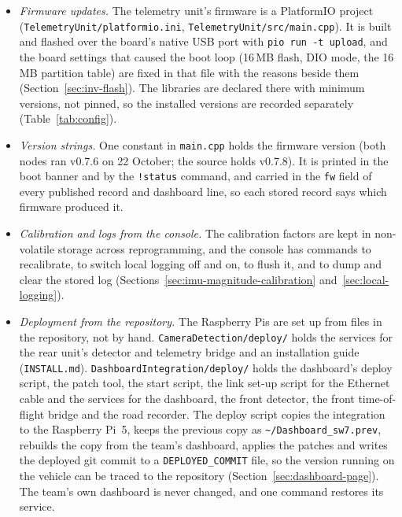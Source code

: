 \begin{itemize}
\item \emph{Firmware updates.} The telemetry unit's firmware is a PlatformIO project (\texttt{TelemetryUnit/\allowbreak{}\allowbreak platformio.ini}, \texttt{TelemetryUnit/\allowbreak{}\allowbreak src/\allowbreak{}main.cpp}). It is built and flashed over the board's native USB port with \texttt{pio run -t upload}, and the board settings that caused the boot loop (16\,MB flash, DIO mode, the 16\,MB partition table) are fixed in that file with the reasons beside them (Section~\ref{sec:inv-flash}). The libraries are declared there with minimum versions, not pinned, so the installed versions are recorded separately (Table~\ref{tab:config}).
\item \emph{Version strings.} One constant in \texttt{main.cpp} holds the firmware version (both nodes ran v0.7.6 on 22 October; the source holds v0.7.8). It is printed in the boot banner and by the \texttt{!status} command, and carried in the \texttt{fw} field of every published record and dashboard line, so each stored record says which firmware produced it.
\item \emph{Calibration and logs from the console.} The calibration factors are kept in non-volatile storage across reprogramming, and the console has commands to recalibrate, to switch local logging off and on, to flush it, and to dump and clear the stored log (Sections~\ref{sec:imu-magnitude-calibration} and~\ref{sec:local-logging}).
\item \emph{Deployment from the repository.} The Raspberry Pis are set up from files in the repository, not by hand. \texttt{CameraDetection/\allowbreak{}\allowbreak deploy/} holds the services for the rear unit's detector and telemetry bridge and an installation guide (\texttt{INSTALL.md}). \texttt{DashboardIntegration/\allowbreak{}\allowbreak deploy/} holds the dashboard's deploy script, the patch tool, the start script, the link set-up script for the Ethernet cable and the services for the dashboard, the front detector, the front time-of-flight bridge and the road recorder. The deploy script copies the integration to the Raspberry Pi~5, keeps the previous copy as \texttt{\textasciitilde/\allowbreak{}Dashboard\_\allowbreak{}sw7.prev}, rebuilds the copy from the team's dashboard, applies the patches and writes the deployed git commit to a \texttt{DEPLOYED\_COMMIT} file, so the version running on the vehicle can be traced to the repository (Section~\ref{sec:dashboard-page}). The team's own dashboard is never changed, and one command restores its service.

\end{itemize}
